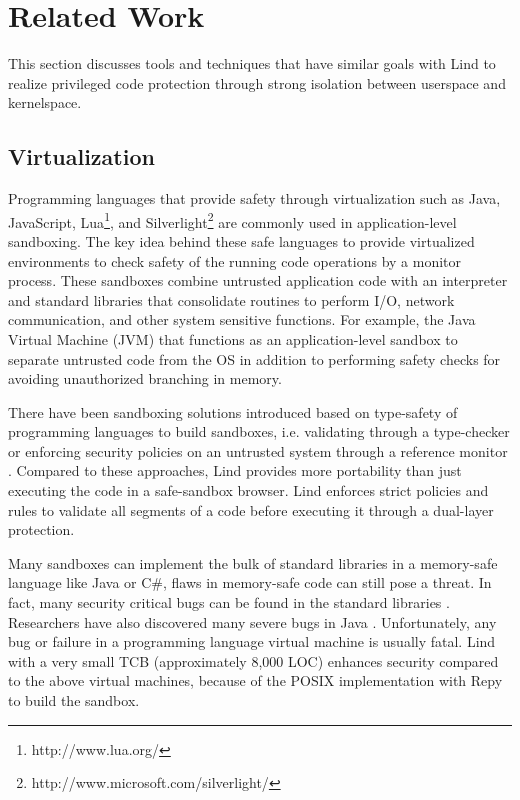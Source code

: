 \section{Related Work}
\label{sec.related_work}

This section discusses tools and techniques that have similar goals with Lind to realize privileged code protection through strong isolation between userspace and kernelspace.

	
\subsection{Virtualization}

Programming languages that provide safety through virtualization such as Java, JavaScript, Lua\footnote{http://www.lua.org/}, and Silverlight\footnote{http://www.microsoft.com/silverlight/} are commonly used in application-level sandboxing. The key idea behind these safe languages to provide virtualized environments to check safety of the running code operations by a monitor process. These sandboxes combine untrusted application code with an interpreter and standard libraries that consolidate routines to perform I/O, network communication, and other system sensitive functions. For example, the Java Virtual Machine (JVM) \cite{JVM} that functions as an application-level sandbox to separate untrusted code from the OS in addition to performing safety checks for avoiding unauthorized branching in memory. 

There have been sandboxing solutions introduced based on type-safety of programming languages to build sandboxes, i.e. validating through a type-checker \cite{JS-Sandboxing} or enforcing security policies on an untrusted system through a reference monitor \cite{JS-Sandboxing1}. Compared to these approaches, Lind provides more portability than just executing the code in a safe-sandbox browser. Lind enforces strict policies and rules to validate all segments of a code before executing it through a dual-layer protection.

Many sandboxes can implement the bulk of standard libraries in a memory-safe language like Java or C\#, flaws in memory-safe code can still pose a threat. In fact, many security critical bugs can be found in the standard libraries \cite{JavaBugs}. Researchers have also discovered many severe bugs in Java \cite{Java-Lessons}. Unfortunately, any bug or failure in a programming language virtual machine is usually fatal. Lind with a very small TCB (approximately 8,000 LOC) enhances security compared to the above virtual machines, because of the POSIX implementation with Repy to build the sandbox.

